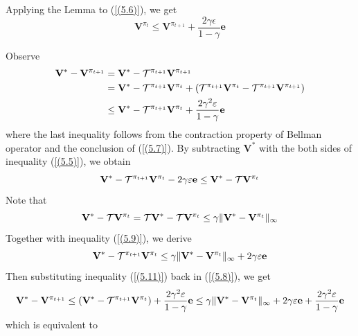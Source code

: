 \begin{Solution}
Applying the Lemma to (\ref{(5.6)}), we get
\begin{equation} \label{(5.7)}
    \mathbf{V}^{\pi_t} \leq \mathbf{V}^{\pi_{t+1}} + \frac{2 \gamma \epsilon}{1 - \gamma} \textbf{e}
\end{equation}

Observe
\begin{equation} \label{(5.8)}
\begin{aligned}
    \mathbf{V}^* - \mathbf{V}^{\pi_{t+1}} & = \mathbf{V}^* - \mathcal{T}^{\pi_{t+1}} \mathbf{V}^{\pi_{t+1}} \\
    & = \mathbf{V}^* - \mathcal{T}^{\pi_{t+1}} \mathbf{V}^{\pi_{t}} + (\mathcal{T}^{\pi_{t+1}} \mathbf{V}^{\pi_{t}} - \mathcal{T}^{\pi_{t+1}} \mathbf{V}^{\pi_{t+1}}) \\
    & \leq \mathbf{V}^* - \mathcal{T}^{\pi_{t+1}} \mathbf{V}^{\pi_{t}} + \frac{2 \gamma^2 \varepsilon}{1 - \gamma} \textbf{e}
\end{aligned}
\end{equation}
where the last inequality follows from the contraction property of Bellman operator and the conclusion of (\ref{(5.7)}). By subtracting $\mathbf{V}^*$ with the both sides of inequality (\ref{(5.5)}), we obtain
\begin{equation} \label{(5.9)}
     \mathbf{V}^* - \mathcal{T}^{\pi_{t+1}} \mathbf{V}^{\pi_t} - 2 \gamma \varepsilon \textbf{e} \leq \mathbf{V}^* - \mathcal{T} \mathbf{V}^{\pi_t}
\end{equation}
Note that
\begin{equation} \label{(5.10)}
    \mathbf{V}^* - \mathcal{T} \mathbf{V}^{\pi_t} = \mathcal{T} \mathbf{V}^* - \mathcal{T} \mathbf{V}^{\pi_t} \leq \gamma \|\mathbf{V}^* - \mathbf{V}^{\pi_t}\|_\infty
\end{equation}
Together with inequality (\ref{(5.9)}), we derive
\begin{equation} \label{(5.11)}
    \mathbf{V}^* - \mathcal{T}^{\pi_{t+1}} \mathbf{V}^{\pi_t} \leq \gamma \|\mathbf{V}^* - \mathbf{V}^{\pi_t}\|_\infty + 2 \gamma \varepsilon \textbf{e}
\end{equation}
Then substituting inequality (\ref{(5.11)}) back in (\ref{(5.8)}), we get
\begin{equation}
    \mathbf{V}^* - \mathbf{V}^{\pi_{t+1}} \leq (\mathbf{V}^* - \mathcal{T}^{\pi_{t+1}} \mathbf{V}^{\pi_{t}}) + \frac{2 \gamma^2 \varepsilon}{1 - \gamma} \textbf{e} \leq \gamma \|\mathbf{V}^* - \mathbf{V}^{\pi_t}\|_\infty + 2 \gamma \varepsilon \textbf{e} + \frac{2 \gamma^2 \varepsilon}{1 - \gamma} \textbf{e}
\end{equation}
which is equivalent to
\begin{equation}

\end{equation}
\end{Solution}
